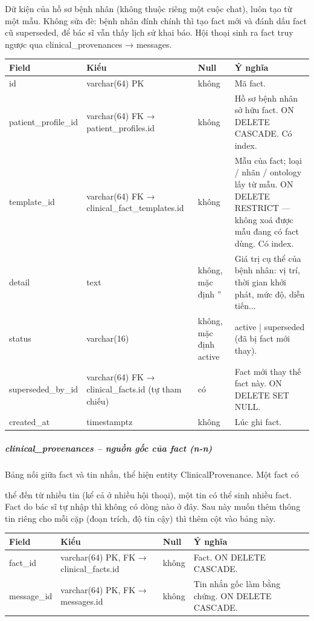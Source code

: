 Dữ kiện của hồ sơ bệnh nhân (không thuộc riêng một cuộc chat), luôn tạo từ một mẫu. Không sửa đè: bệnh nhân đính chính thì tạo fact mới và đánh dấu fact cũ superseded, để bác sĩ vẫn thấy lịch sử khai báo. Hội thoại sinh ra fact truy ngược qua clinical\_provenances → messages.
\begin{longtable}{|>{\raggedright\arraybackslash}p{0.250\dimexpr\linewidth-8\tabcolsep\relax}|>{\raggedright\arraybackslash}p{0.250\dimexpr\linewidth-8\tabcolsep\relax}|>{\raggedright\arraybackslash}p{0.250\dimexpr\linewidth-8\tabcolsep\relax}|>{\raggedright\arraybackslash}p{0.250\dimexpr\linewidth-8\tabcolsep\relax}|}
\hline
\textbf{Field} & \textbf{Kiểu} & \textbf{Null} & \textbf{Ý nghĩa} \\ \hline
\endhead
id & varchar(64) PK & không & Mã fact. \\ \hline
patient\_profile\_id & varchar(64) FK → patient\_profiles.id & không & Hồ sơ bệnh nhân sở hữu fact. ON DELETE CASCADE. Có index. \\ \hline
template\_id & varchar(64) FK → clinical\_fact\_templates.id & không & Mẫu của fact; loại / nhãn / ontology lấy từ mẫu. ON DELETE RESTRICT --- không xoá được mẫu đang có fact dùng. Có index. \\ \hline
detail & text & không, mặc định '' & Giá trị cụ thể của bệnh nhân: vị trí, thời gian khởi phát, mức độ, diễn tiến... \\ \hline
status & varchar(16) & không, mặc định active & active | superseded (đã bị fact mới thay). \\ \hline
superseded\_by\_id & varchar(64) FK → clinical\_facts.id (tự tham chiếu) & có & Fact mới thay thế fact này. ON DELETE SET NULL. \\ \hline
created\_at & timestamptz & không & Lúc ghi fact. \\ \hline
\end{longtable}

\subparagraph{clinical\_provenances -- nguồn gốc của fact (n-n)}

Bảng nối giữa fact và tin nhắn, thể hiện entity ClinicalProvenance. Một fact có

thể đến từ nhiều tin (kể cả ở nhiều hội thoại), một tin có thể sinh nhiều fact. Fact do bác sĩ tự nhập thì không có dòng nào ở đây. Sau này muốn thêm thông tin riêng cho mỗi cặp (đoạn trích, độ tin cậy) thì thêm cột vào bảng này.
\begin{longtable}{|>{\raggedright\arraybackslash}p{0.250\dimexpr\linewidth-8\tabcolsep\relax}|>{\raggedright\arraybackslash}p{0.250\dimexpr\linewidth-8\tabcolsep\relax}|>{\raggedright\arraybackslash}p{0.250\dimexpr\linewidth-8\tabcolsep\relax}|>{\raggedright\arraybackslash}p{0.250\dimexpr\linewidth-8\tabcolsep\relax}|}
\hline
\textbf{Field} & \textbf{Kiểu} & \textbf{Null} & \textbf{Ý nghĩa} \\ \hline
\endhead
fact\_id & varchar(64) PK, FK → clinical\_facts.id & không & Fact. ON DELETE CASCADE. \\ \hline
message\_id & varchar(64) PK, FK → messages.id & không & Tin nhắn gốc làm bằng chứng. ON DELETE CASCADE. \\ \hline
\end{longtable}


